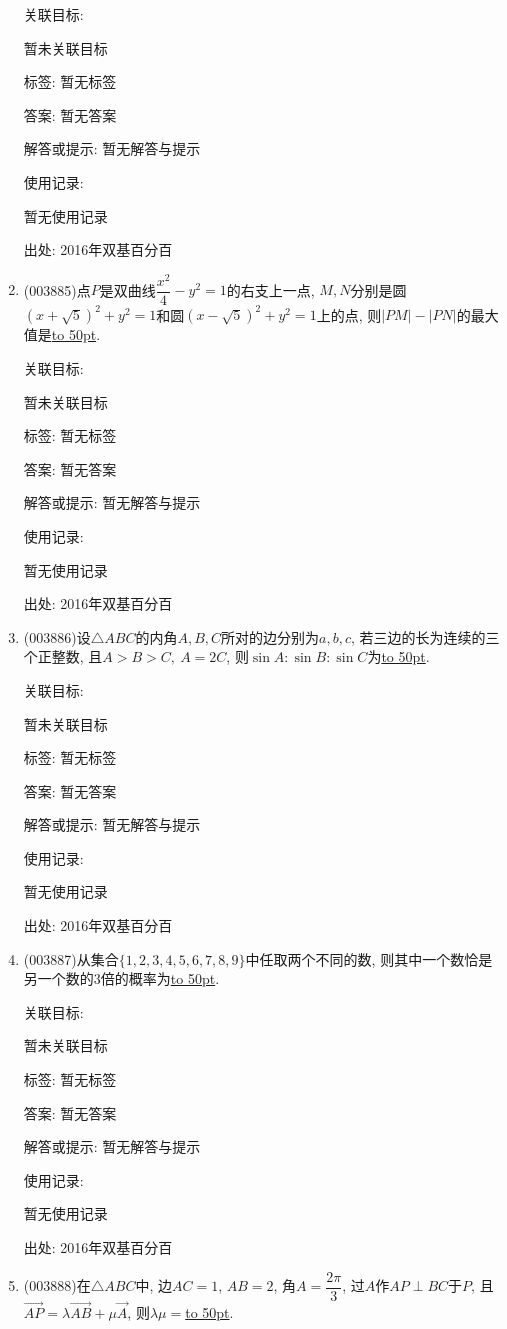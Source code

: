 \documentclass[10pt,a4paper]{article}
\newcommand{\blank}[1]{\underline{\hbox to #1pt{}}}
\begin{document}
\begin{enumerate}[1.]
关联目标:

暂未关联目标



标签: 暂无标签

答案: 暂无答案

解答或提示: 暂无解答与提示

使用记录:

暂无使用记录


出处: 2016年双基百分百
\item { (003885)}点$P$是双曲线$\dfrac{x^2}{4}-y^2=1$的右支上一点, $M,N$分别是圆$(x+\sqrt{5})^2+y^2=1$和圆$(x-\sqrt{5})^2+y^2=1$上的点, 则$|PM|-|PN|$的最大值是\blank{50}.


关联目标:

暂未关联目标



标签: 暂无标签

答案: 暂无答案

解答或提示: 暂无解答与提示

使用记录:

暂无使用记录


出处: 2016年双基百分百
\item { (003886)}设$\triangle ABC$的内角$A,B,C$所对的边分别为$a,b,c$, 若三边的长为连续的三个正整数, 且$A>B>C, \ A=2C$, 则$\sin A:\sin B:\sin C$为\blank{50}.


关联目标:

暂未关联目标



标签: 暂无标签

答案: 暂无答案

解答或提示: 暂无解答与提示

使用记录:

暂无使用记录


出处: 2016年双基百分百
\item { (003887)}从集合$\{1,2,3,4,5,6,7,8,9\}$中任取两个不同的数, 则其中一个数恰是另一个数的$3$倍的概率为\blank{50}.


关联目标:

暂未关联目标



标签: 暂无标签

答案: 暂无答案

解答或提示: 暂无解答与提示

使用记录:

暂无使用记录


出处: 2016年双基百分百
\item { (003888)}在$\triangle ABC$中, 边$AC=1$, $AB=2$, 角$A=\dfrac{2\pi}{3}$, 过$A$作$AP\perp BC$于$P$, 且$\overrightarrow{AP}=\lambda \overrightarrow{AB}+\mu \overrightarrow{A}$, 则$\lambda\mu=$\blank{50}.



\end{enumerate}
\end{document}

